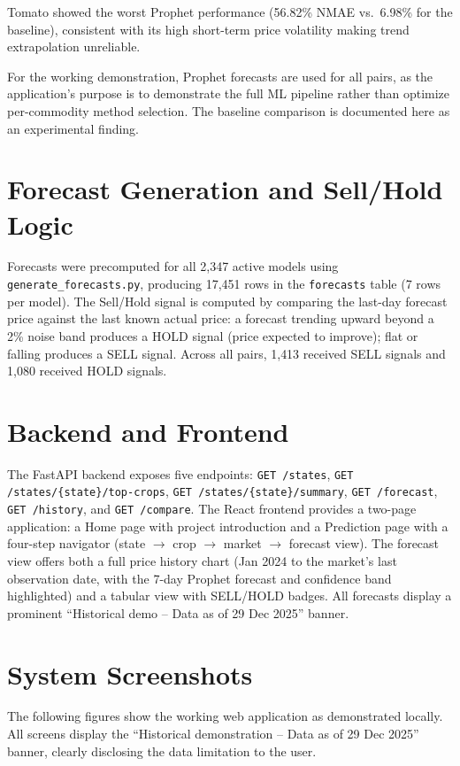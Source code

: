 Tomato showed the worst Prophet performance (56.82\% NMAE vs.\ 6.98\%
for the baseline), consistent with its high short-term price volatility
making trend extrapolation unreliable.

For the working demonstration, Prophet forecasts are used for all pairs,
as the application's purpose is to demonstrate the full ML pipeline
rather than optimize per-commodity method selection. The baseline
comparison is documented here as an experimental finding.

\section{Forecast Generation and Sell/Hold Logic}
Forecasts were precomputed for all 2{,}347 active models using
\texttt{generate\_forecasts.py}, producing 17{,}451 rows in the
\texttt{forecasts} table (7 rows per model). The Sell/Hold signal is
computed by comparing the last-day forecast price against the last known
actual price: a forecast trending upward beyond a 2\% noise band
produces a HOLD signal (price expected to improve); flat or falling
produces a SELL signal. Across all pairs, 1{,}413 received SELL signals
and 1{,}080 received HOLD signals.

\section{Backend and Frontend}
The FastAPI backend exposes five endpoints: \texttt{GET /states},
\texttt{GET /states/\{state\}/top-crops}, \texttt{GET
/states/\{state\}/summary}, \texttt{GET /forecast}, \texttt{GET
/history}, and \texttt{GET /compare}. The React frontend provides a
two-page application: a Home page with project introduction and a
Prediction page with a four-step navigator (state $\to$ crop $\to$
market $\to$ forecast view). The forecast view offers both a full price
history chart (Jan 2024 to the market's last observation date, with the
7-day Prophet forecast and confidence band highlighted) and a tabular
view with SELL/HOLD badges. All forecasts display a prominent
``Historical demo -- Data as of 29 Dec 2025'' banner.

\section{System Screenshots}
The following figures show the working web application as demonstrated
locally. All screens display the ``Historical demonstration -- Data as
of 29 Dec 2025'' banner, clearly disclosing the data limitation to the
user.

